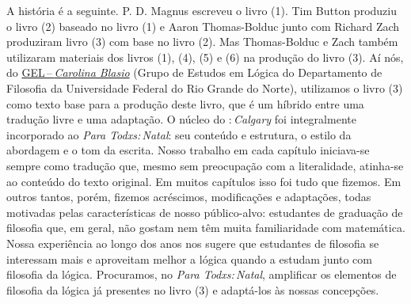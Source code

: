 \noindent A história é a seguinte.
P. D. Magnus escreveu o livro (1). Tim Button produziu o livro (2) baseado no livro (1) e Aaron Thomas-Bolduc junto com Richard Zach produziram  livro (3) com base no livro (2).
Mas Thomas-Bolduc e Zach também utilizaram materiais dos livros (1), (4), (5) e (6) na produção do livro (3).
Aí nós, do \href{https://gelogica.weebly.com/}{GEL\,--\,\textit{Carolina Blasio}} (Grupo de Estudos em Lógica do Departamento de Filosofia da Universidade Federal do Rio Grande do Norte), utilizamos o livro (3) como texto base para a produção deste livro, que é um híbrido entre uma tradução livre e uma adaptação. O núcleo do \forallx:\,\textit{Calgary} foi integralmente incorporado ao \textit{Para Todxs:\,Natal}: seu conteúdo e estrutura, o estilo da abordagem e o tom da escrita. Nosso trabalho em cada capítulo iniciava-se sempre como tradução que, mesmo sem preocupação com a literalidade, atinha-se ao conteúdo do texto original. Em muitos capítulos isso foi tudo que fizemos. Em outros tantos, porém, fizemos acréscimos, modificações e adaptações, todas motivadas pelas características de nosso público-alvo: estudantes de graduação de filosofia que, em geral, não gostam nem têm muita familiaridade com matemática.
Nossa experiência ao longo dos anos nos sugere que estudantes de filosofia se interessam mais e aproveitam melhor a lógica quando a estudam junto com filosofia da lógica. Procuramos, no \textit{Para Todxs:\,Natal}, amplificar os elementos de filosofia da lógica já presentes no livro (3) e adaptá-los às nossas concepções.

